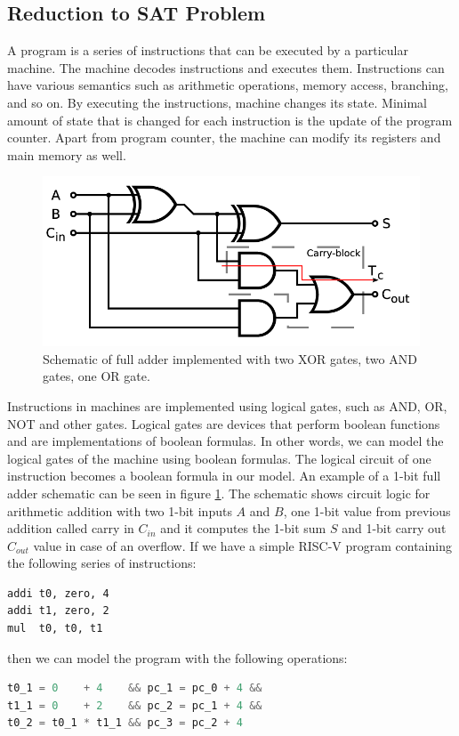 \documentclass[12pt]{article}
\begin{document}
\subsection{Reduction to SAT Problem}

A program is a series of instructions that can be executed by a particular
machine. The machine decodes instructions and executes them. Instructions can 
have various semantics such as arithmetic operations, memory access, branching,
and so on. By executing the instructions, machine changes its state. Minimal
amount of state that is changed for each instruction is the update of the
program counter. Apart from program counter, the machine can modify its
registers and main memory as well.


\begin{figure}
    \includegraphics[width=\linewidth]{assets/full_adder_schematic.png}
    \centering
    \caption{
        Schematic of full adder implemented with two XOR gates, two AND gates,
        one OR gate.
    }
    \label{fig:full_adder_schematic}
\end{figure}

Instructions in machines are implemented using logical gates, such as AND, OR,
NOT and other gates. Logical gates are devices that perform boolean functions 
and are implementations of boolean formulas. In other words, we can model the
logical gates of the machine using boolean formulas. The logical circuit of one
instruction becomes a boolean formula in our model. An example of a 1-bit full
adder schematic can be seen in figure \ref{fig:full_adder_schematic}. The
schematic shows circuit logic for arithmetic addition with two 1-bit inputs $A$
and $B$, one 1-bit value from previous addition called carry in $C_{in}$ and it
computes the 1-bit sum $S$ and 1-bit carry out $C_{out}$ value in case of an
overflow. If we have a simple RISC-V program containing the following series of
instructions:
\begin{lstlisting}[language={[RISC-V]Assembler}, label=lst:example_riscv_program]
addi t0, zero, 4
addi t1, zero, 2
mul  t0, t0, t1
\end{lstlisting}
then we can model the program with the following operations:
\begin{lstlisting}[language=C, label=lst:example_model, caption=Example model]
t0_1 = 0    + 4    && pc_1 = pc_0 + 4 &&
t1_1 = 0    + 2    && pc_2 = pc_1 + 4 &&
t0_2 = t0_1 * t1_1 && pc_3 = pc_2 + 4 
\end{lstlisting}
\end{document}
